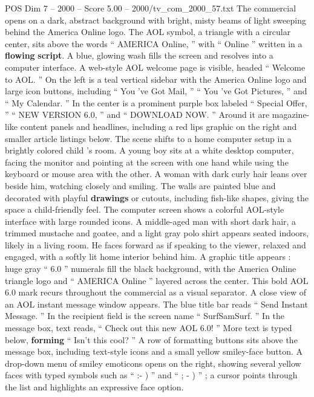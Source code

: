\begin{textsample}{POS Dim 7 – 2000 – Score 5.00 – 2000/tv\_com\_2000\_57.txt}  \label{ex:f7_pos_080}
The commercial opens on a dark, abstract background with bright, misty beams of light sweeping behind the America Online logo.
The AOL symbol, a triangle with a circular center, sits above the words “ AMERICA Online, ” with “ Online ” written in a \textbf{flowing} \textbf{script}.
A blue, glowing wash fills the screen and resolves into a computer interface.
A web-style AOL welcome page is visible, headed “ Welcome to AOL. ” On the left is a teal vertical sidebar with the America Online logo and large icon buttons, including “ You ’ve Got Mail, ” “ You ’ve Got Pictures, ” and “ My Calendar. ” In the center is a prominent purple box labeled “ Special Offer, ” “ NEW VERSION 6.0, ” and “ DOWNLOAD NOW. ” Around it are magazine-like content panels and headlines, including a red lips graphic on the right and smaller article listings below.
The scene shifts to a home computer setup in a brightly colored child ’s room.
A young boy sits at a white desktop computer, facing the monitor and pointing at the screen with one hand while using the keyboard or mouse area with the other.
A woman with dark curly hair leans over beside him, watching closely and smiling.
The walls are painted blue and decorated with playful \textbf{drawings} or cutouts, including fish-like shapes, giving the space a child-friendly feel.
The computer screen shows a colorful AOL-style interface with large rounded icons.
A middle-aged man with short dark hair, a trimmed mustache and goatee, and a light gray polo shirt appears seated indoors, likely in a living room.
He faces forward as if speaking to the viewer, relaxed and engaged, with a softly lit home interior behind him.
A graphic title appears : huge gray “ 6.0 ” numerals fill the black background, with the America Online triangle logo and “ AMERICA Online ” layered across the center.
This bold AOL 6.0 mark recurs throughout the commercial as a visual separator.
A close view of an AOL instant message window appears.
The blue title bar reads “ Send Instant Message. ” In the recipient field is the screen name “ SurfSamSurf. ” In the message box, text reads, “ Check out this new AOL 6.0! ” More text is typed below, \textbf{forming} “ Isn't this cool? ” A row of formatting buttons sits above the message box, including text-style icons and a small yellow smiley-face button.
A drop-down menu of smiley emoticons opens on the right, showing several yellow faces with typed symbols such as “ :- ) ” and “ ; - ) ” ; a cursor points through the list and highlights an expressive face option.

\end{textsample}
